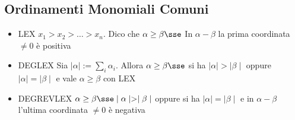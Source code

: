 \documentclass[a4paper,NoNotes,GeneralMath]{stdmdoc}
\begin{document}
	\subsection*{Ordinamenti Monomiali Comuni}
	\begin{itemize}
		\item LEX $x_1 > x_2 > \ldots > x_n$. Dico che $\alpha \ge \beta \sse$ In $\alpha - \beta$ la prima coordinata $\neq 0$ è positiva
		\item DEGLEX Sia $\mid \alpha \mid := \sum_i \alpha_i$. Allora $\alpha \ge \beta \sse$ si ha $\mid \alpha \mid > \mid \beta \mid$ oppure $\mid \alpha \mid = \mid \beta \mid$ e vale $\alpha \ge \beta$ con LEX
		\item DEGREVLEX $\alpha \ge \beta \sse \mid \alpha \mid > \mid \beta \mid$ oppure si ha $\mid \alpha \mid = \mid \beta \mid$ e in $\alpha - \beta$ l'ultima coordinata $\neq 0$ è negativa
	\end{itemize}
\end{document}
